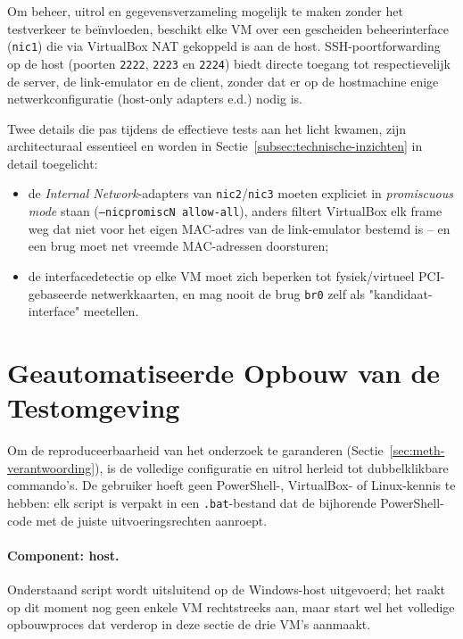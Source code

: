 Om beheer, uitrol en gegevensverzameling mogelijk te maken zonder het testverkeer te
beïnvloeden, beschikt elke VM over een gescheiden beheerinterface (\texttt{nic1}) die via
VirtualBox NAT gekoppeld is aan de host. SSH-poortforwarding op de host (poorten
\texttt{2222}, \texttt{2223} en \texttt{2224}) biedt directe toegang tot respectievelijk
de server, de link-emulator en de client, zonder dat er op de hostmachine enige
netwerkconfiguratie (host-only adapters e.d.) nodig is.

Twee details die pas tijdens de effectieve tests aan het licht kwamen, zijn architecturaal
essentieel en worden in Sectie~\ref{subsec:technische-inzichten} in detail toegelicht:
\begin{itemize}
  \item de \textit{Internal Network}-adapters van \texttt{nic2}/\texttt{nic3} moeten
        expliciet in \textit{promiscuous mode} staan (\texttt{--nicpromiscN allow-all}),
        anders filtert VirtualBox elk frame weg dat niet voor het eigen MAC-adres van de
        link-emulator bestemd is -- en een brug moet net vreemde MAC-adressen
        doorsturen;
  \item de interfacedetectie op elke VM moet zich beperken tot fysiek/virtueel
        PCI-gebaseerde netwerkkaarten, en mag nooit de brug \texttt{br0} zelf als
        "kandidaat-interface" meetellen.
\end{itemize}

\section{Geautomatiseerde Opbouw van de Testomgeving}%
\label{sec:automatisering-poc}

Om de reproduceerbaarheid van het onderzoek te garanderen (Sectie~\ref{sec:meth-verantwoording}),
is de volledige configuratie en uitrol herleid tot dubbelklikbare commando's. De
gebruiker hoeft geen PowerShell-, VirtualBox- of Linux-kennis te hebben: elk script is
verpakt in een \texttt{.bat}-bestand dat de bijhorende PowerShell-code met de juiste
uitvoeringsrechten aanroept.

\paragraph{Component: host.} Onderstaand script wordt uitsluitend op de Windows-host
uitgevoerd; het raakt op dit moment nog geen enkele VM rechtstreeks aan, maar start wel
het volledige opbouwproces dat verderop in deze sectie de drie VM's aanmaakt.

